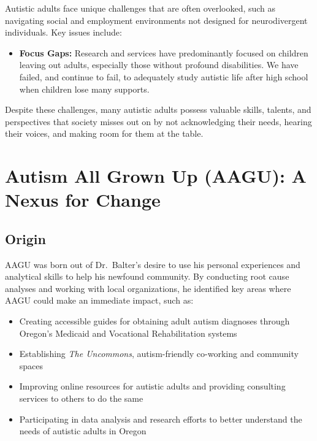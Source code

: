 \documentclass[
  letterpaper,
  DIV=11,
  numbers=noendperiod]{scrreprt}
\providecommand{\tightlist}{%
  \setlength{\itemsep}{0pt}\setlength{\parskip}{0pt}}\usepackage{longtable,booktabs,array}
\begin{document}
Autistic adults face unique challenges that are often overlooked, such
as navigating social and employment environments not designed for
neurodivergent individuals. Key issues include:

\begin{itemize}
\tightlist
\item
  \textbf{Focus Gaps:} Research and services have predominantly focused
  on children leaving out adults, especially those without profound
  disabilities. We have failed, and continue to fail, to adequately
  study autistic life after high school when children lose many
  supports.
\end{itemize}

Despite these challenges, many autistic adults possess valuable skills,
talents, and perspectives that society misses out on by not
acknowledging their needs, hearing their voices, and making room for
them at the table.


\chapter{Autism All Grown Up (AAGU): A Nexus for Change}\label{sec-aagu}

\section{Origin}\label{sec-aagu_origin}

AAGU was born out of Dr.~Balter's desire to use his personal experiences
and analytical skills to help his newfound community. By conducting root
cause analyses and working with local organizations, he identified key
areas where AAGU could make an immediate impact, such as:

\begin{itemize}
\tightlist
\item
  Creating accessible guides for obtaining adult autism diagnoses
  through Oregon's Medicaid and Vocational Rehabilitation systems
\item
  Establishing \emph{The Uncommons}, autism-friendly co-working and
  community spaces
\item
  Improving online resources for autistic adults and providing
  consulting services to others to do the same
\item
  Participating in data analysis and research efforts to better
  understand the needs of autistic adults in Oregon
\end{itemize}
\end{document}
